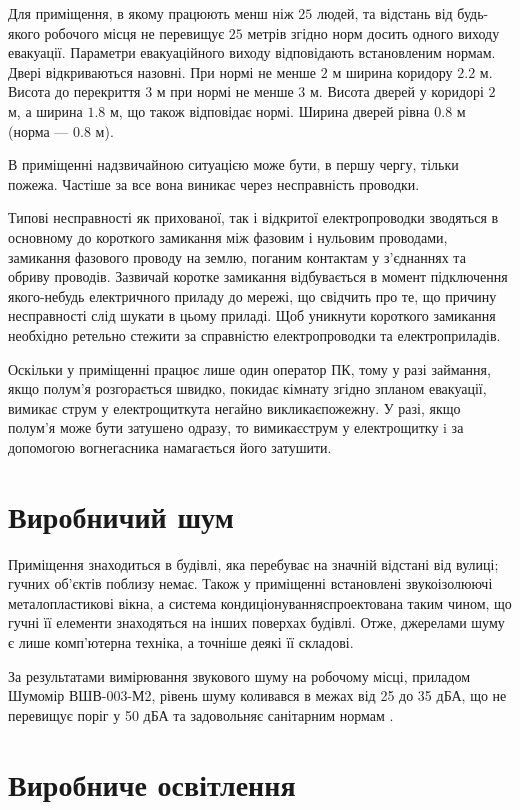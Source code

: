 Для приміщення, в якому працюють менш ніж $25$ людей, та відстань від будь-якого
робочого місця не перевищує $25$ метрів згідно норм досить одного виходу
евакуації. Параметри евакуаційного виходу відповідають встановленим нормам.
Двері відкриваються назовні.
При нормі не менше $2$ м ширина коридору $2.2$ м.
Висота до перекриття $3$ м при нормі не менше $3$ м.
Висота дверей у коридорі $2$ м, а ширина $1.8$ м, що також відповідає нормі.
Ширина дверей рівна $0.8$ м  (норма --- $0.8$ м).

В приміщенні надзвичайною ситуацією може бути, в першу чергу, тільки пожежа.
Частіше за все вона виникає через несправність проводки.

Типові несправності як прихованої, так і відкритої електропроводки зводяться
в основному до короткого замикання між фазовим і нульовим проводами,
замикання фазового проводу на землю, поганим контактам у з'єднаннях та обриву
проводів.
Зазвичай коротке замикання відбувається в момент підключення якого-небудь
електричного приладу до мережі, що свідчить про те, що причину несправності слід
шукати в цьому приладі.
Щоб уникнути короткого замикання необхідно ретельно стежити за
справністю електропроводки та електроприладів.

Оскільки у приміщенні працює лише один оператор ПК, тому у разі займання,
якщо полум’я розгорається швидко, покидає кімнату згідно зпланом евакуації,
вимикає струм у електрощиткута негайно викликаєпожежну.
У разі, якщо полум’я може бути затушено одразу, то вимикаєструм у електрощитку
i за допомогою вогнегасника намагається його затушити.

\section{Виробничий шум}

Приміщення знаходиться в будівлі, яка перебуває на значній відстані від вулиці;
гучних об’єктів поблизу немає.
Також у приміщенні встановлені звукоізолюючі металопластикові вікна,
а система кондиціонуванняспроектована таким чином,
що гучні її елементи знаходяться на інших поверхах будівлі.
Отже, джерелами шуму є лише комп’ютерна техніка, а точніше деякі її складові.

За результатами вимірювання звукового шуму на робочому місці,
приладом Шумомір ВШВ-003-М2, рівень шуму коливався в межах від 25 до 35 дБА, 
що не перевищує поріг у 50 дБА та задовольняє санітарним нормам \cite{DSanPiN}.

\section{Виробниче освітлення}

